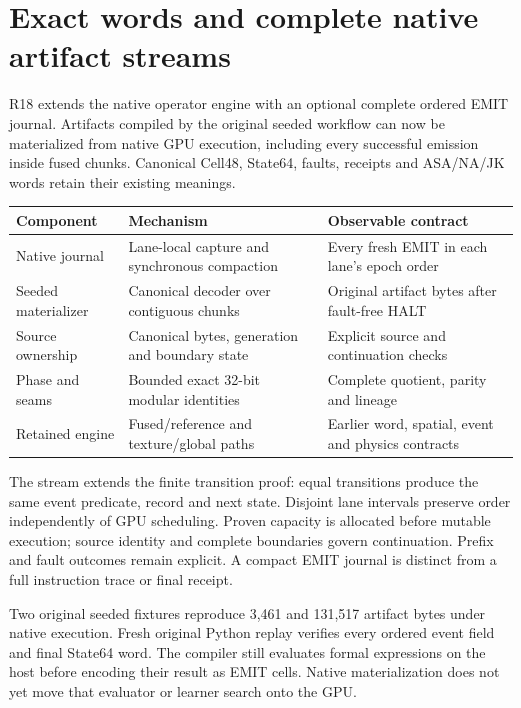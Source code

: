 \section*{Exact words and complete native artifact streams}
R18 extends the native operator engine with an optional complete ordered
EMIT journal. Artifacts compiled by the original seeded workflow can now
be materialized from native GPU execution, including every successful
emission inside fused chunks. Canonical Cell48, State64, faults, receipts
and ASA/NA/JK words retain their existing meanings.

\begin{center}\small
\begin{tabularx}{\linewidth}{@{}P{33mm}Y Y@{}}
\toprule Component & Mechanism & Observable contract\\\midrule
Native journal & Lane-local capture and synchronous compaction & Every fresh EMIT in each lane's epoch order\\
Seeded materializer & Canonical decoder over contiguous chunks & Original artifact bytes after fault-free HALT\\
Source ownership & Canonical bytes, generation and boundary state & Explicit source and continuation checks\\
Phase and seams & Bounded exact 32-bit modular identities & Complete quotient, parity and lineage\\
Retained engine & Fused/reference and texture/global paths & Earlier word, spatial, event and physics contracts\\
\bottomrule
\end{tabularx}\end{center}

The stream extends the finite transition proof: equal transitions produce
the same event predicate, record and next state. Disjoint lane intervals
preserve order independently of GPU scheduling. Proven capacity is
allocated before mutable execution; source identity and complete boundaries
govern continuation. Prefix and fault outcomes remain explicit. A compact
EMIT journal is distinct from a full instruction trace or final receipt.

Two original seeded fixtures reproduce 3,461 and 131,517 artifact bytes
under native execution. Fresh original Python replay verifies every
ordered event field and final State64 word. The compiler still evaluates
formal expressions on the host before encoding their result as EMIT cells.
Native materialization does not yet move that evaluator or learner search
onto the GPU.

